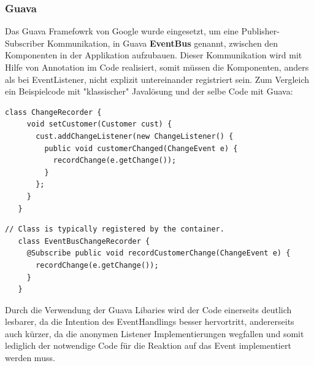 \documentclass[a4paper,12pt]{article}
\begin{document}
\subsubsection{Guava}
Das Guava Framefowrk von Google wurde eingesetzt, um eine Publisher-Subscriber Kommunikation, in Guava \textbf{EventBus} genannt, zwischen den Komponenten in der Applikation aufzubauen. Dieser Kommunikation wird mit Hilfe von Annotation im Code realisiert, somit müssen die Komponenten, anders als bei EventListener, nicht explizit untereinander registriert sein. Zum Vergleich ein Beispielcode mit "klassischer" Javalösung und der selbe Code mit Guava:\\
\lstset{language=Java}
\begin{lstlisting}[caption={klassische Javalösung \cite{guava-libaries} }]
    class ChangeRecorder {
     void setCustomer(Customer cust) {
       cust.addChangeListener(new ChangeListener() {
         public void customerChanged(ChangeEvent e) {
           recordChange(e.getChange());
         }
       };
     }
   }
\end{lstlisting}\newpage
\lstset{language=Java}
\begin{lstlisting}[caption={Lösung mit Guava \cite{guava-libaries}}]
    // Class is typically registered by the container.
   class EventBusChangeRecorder {
     @Subscribe public void recordCustomerChange(ChangeEvent e) {
       recordChange(e.getChange());
     }
   }
\end{lstlisting}
Durch die Verwendung der Guava Libaries wird der Code einerseits deutlich lesbarer, da die Intention des EventHandlings besser hervortritt, andererseits auch kürzer, da die anonymen Listener Implementierungen wegfallen und somit lediglich der notwendige Code für die Reaktion auf das Event implementiert werden muss.
\end{document}
